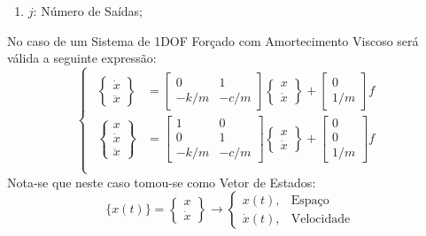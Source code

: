 \documentclass{article}
\begin{document}
\begin{resolution}
\begin{enumerate}
\begin{enumerate}[noitemsep]
            \item $j$: Número de Saídas;
        \end{enumerate}
    \end{enumerate}
    No caso de um Sistema de 1DOF Forçado com Amortecimento Viscoso será válida a seguinte expressão:
    \begin{equation}
    \begin{cases}
    \begin{aligned}
        \begin{Bmatrix} \dot{x}\\ \ddot{x} \end{Bmatrix} &=
        \begin{bmatrix} 0 & 1\\ -k/m & -c/m\end{bmatrix}\begin{Bmatrix} x\\ \dot{x} \end{Bmatrix} + 
        \begin{bmatrix} 0\\ 1/m \end{bmatrix} f\\
        \begin{Bmatrix} x\\ \dot{x}\\ \ddot{x} \end{Bmatrix} &=
        \begin{bmatrix} 1 & 0\\ 0 & 1\\ -k/m & -c/m\end{bmatrix}\begin{Bmatrix} x\\ \dot{x} \end{Bmatrix} + 
        \begin{bmatrix} 0\\ 0\\ 1/m \end{bmatrix} f\\
    \end{aligned}
    \end{cases}
    \end{equation}
    Nota-se que neste caso tomou-se como Vetor de Estados:
    \begin{equation*}
        \lbrace x(t) \rbrace = \begin{Bmatrix} x\\ \dot{x} \end{Bmatrix} 
        \to \begin{cases} x(t), &\text{Espaço}\\ \dot{x}(t),&\text{Velocidade} \end{cases}

\end{equation*}
\end{resolution}
\end{document}
